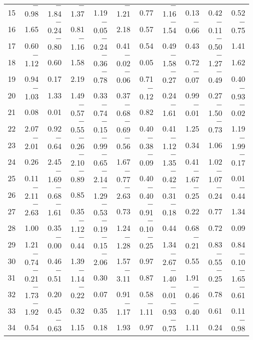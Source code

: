 \documentclass[letterpaper]{article}
\begin{document}
\begin{Schunk}
\begin{longtable}{rrrrrrrrrrr}
  15 & $-$0.98 & $-$1.84 & $-$1.37 & 1.19 & $-$1.21 & 0.77 & $-$1.16 & 0.13 & 0.42 & 0.52 \\
  16 & 1.65 & $-$0.24 & 0.81 & $-$0.05 & 2.18 & 0.57 & $-$1.54 & $-$0.66 & $-$0.11 & $-$0.75 \\
  17 & 0.60 & $-$0.80 & $-$1.16 & $-$0.24 & 0.41 & 0.54 & 0.49 & 0.43 & $-$0.50 & 1.41 \\
  18 & $-$1.12 & 0.60 & 1.58 & $-$0.36 & $-$0.02 & 0.05 & $-$1.58 & 0.72 & $-$1.27 & 1.62 \\
  19 & 0.94 & 0.17 & 2.19 & $-$0.78 & $-$0.06 & 0.71 & $-$0.27 & $-$0.07 & $-$0.49 & 0.40 \\
  20 & $-$1.03 & 1.33 & 1.49 & 0.33 & 0.37 & $-$0.12 & 0.24 & 0.99 & 0.27 & $-$0.93 \\
  21 & 0.08 & 0.01 & $-$0.57 & $-$0.74 & $-$0.68 & 0.82 & $-$1.61 & $-$0.01 & $-$1.50 & $-$0.02 \\
  22 & 2.07 & 0.92 & $-$0.55 & $-$0.15 & $-$0.69 & 0.40 & 0.41 & 1.25 & $-$0.73 & 1.19 \\
  23 & $-$2.01 & $-$0.64 & $-$0.26 & $-$0.99 & $-$0.56 & $-$0.38 & $-$1.12 & 0.34 & 1.06 & $-$1.99 \\
  24 & 0.26 & 2.45 & $-$2.10 & $-$0.65 & 1.67 & $-$0.09 & $-$1.35 & 0.41 & 1.02 & $-$0.17 \\
  25 & 0.11 & $-$1.69 & $-$0.89 & $-$2.14 & $-$0.77 & 0.40 & $-$0.42 & $-$1.67 & $-$1.07 & 0.01 \\
  26 & $-$2.11 & $-$0.68 & 0.85 & $-$1.29 & $-$2.63 & $-$0.40 & $-$0.31 & $-$0.25 & $-$0.24 & $-$0.44 \\
  27 & $-$2.63 & $-$1.61 & 0.35 & $-$0.53 & 0.73 & $-$0.91 & $-$0.18 & 0.22 & 0.77 & 1.34 \\
  28 & 1.00 & 0.35 & $-$1.12 & $-$0.19 & 1.24 & $-$0.10 & 0.44 & 0.68 & 0.72 & 0.09 \\
  29 & 1.21 & $-$0.00 & $-$0.44 & $-$0.15 & $-$1.28 & $-$0.25 & 1.34 & $-$0.21 & 0.83 & 0.84 \\
  30 & $-$0.74 & 0.46 & 1.39 & $-$2.06 & 1.57 & 0.97 & $-$2.67 & 0.55 & $-$0.55 & $-$0.10 \\
  31 & $-$0.21 & $-$0.51 & $-$1.14 & 0.30 & $-$3.11 & 0.87 & $-$1.40 & 1.91 & $-$0.25 & $-$1.65 \\
  32 & $-$1.73 & 0.20 & $-$0.22 & 0.07 & 0.91 & 0.58 & $-$0.01 & $-$0.46 & 0.78 & $-$0.61 \\
  33 & $-$1.92 & 0.45 & 0.32 & 0.35 & $-$1.17 & $-$1.11 & $-$0.93 & $-$0.40 & 0.61 & 0.11 \\
  34 & 0.54 & $-$0.63 & 1.15 & 0.18 & 1.93 & 0.97 & $-$0.75 & 1.11 & 0.24 & $-$0.98 \\

\end{longtable}
\end{Schunk}
\end{document}
